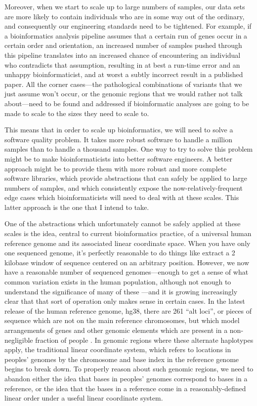 \documentclass[11pt,proposal]{ucthesis}
\begin{document}
Moreover, when we start to scale up to large numbers of samples, our data sets are more likely to contain individuals who are in some way out of the ordinary, and consequently our engineering standards need to be tightened. For example, if a bioinformatics analysis pipeline assumes that a certain run of genes occur in a certain order and orientation, an increased number of samples pushed through this pipeline translates into an increased chance of encountering an individual who contradicts that assumption, resulting in at best a run-time error and an unhappy bioinformaticist, and at worst a subtly incorrect result in a published paper. All the corner cases---the pathological combinations of variants that we just assume won't occur, or the genomic regions that we would rather not talk about---need to be found and addressed if bioinformatic analyses are going to be made to scale to the sizes they need to scale to.

This means that in order to scale up bioinformatics, we will need to solve a software quality problem. It takes more robust software to handle a million samples than to handle a thousand samples. One way to try to solve this problem might be to make bioinformaticists into better software engineers. A better approach might be to provide them with more robust and more complete software libraries, which provide abstractions that can safely be applied to large numbers of samples, and which consistently expose the now-relatively-frequent edge cases which bioinformaticists will need to deal with at these scales. This latter approach is the one that I intend to take.

One of the abstractions which unfortunately cannot be safely applied at these scales is the idea, central to current bioinformatics practice, of a universal human reference genome and its associated linear coordinate space. When you have only one sequenced genome, it's perfectly reasonable to do things like extract a 2 kilobase window of sequence centered on an arbitrary position. However, we now have a reasonable number of sequenced genomes---enough to get a sense of what common variation exists in the human population, although not enough to understand the significance of many of these \cite{10002010map}---and it is growing increasingly clear that that sort of operation only makes sense in certain cases. In the latest release of the human reference genome, hg38, there are 261 ``alt loci'', or pieces of sequence which are not on the main reference chromosomes, but which model arrangements of genes and other genomic elements which are present in a non-negligible fraction of people \cite{karolchik2104new}. In genomic regions where these alternate haplotypes apply, the traditional linear coordinate system, which refers to locations in peoples' genomes by the chromosome and base index in the reference genome begins to break down. To properly reason about such genomic regions, we need to abandon either the idea that bases in peoples' genomes correspond to bases in a reference, or the idea that the bases in a reference come in a reasonably-defined linear order under a useful linear coordinate system.
\end{document}
